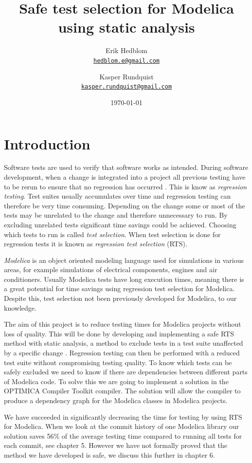 \documentclass{cslthse-msc}
\author{
	Erik Hedblom \\
	{\normalsize \href{mailto:hedblom.e@gmail.com}{\texttt{hedblom.e@gmail.com}}}
	\and
	Kasper Rundquist \\
	{\normalsize \href{mailto:kasper.rundquist@gmail.com}{\texttt{kasper.rundquist@gmail.com}}}
}
\title{Safe test selection for Modelica using static analysis}
\date{\today}
\begin{document}
\makefrontmatter
\chapter[Introduction]{Introduction}
Software tests are used to verify that software works as intended.
During software development, when a change is integrated into a project all previous testing have to be rerun to ensure that no regression has occurred \cite{DBLP:conf/sigsoft/LegunsenHSLZM16, haider2016safe}. This is know as \emph{regression testing}. Test suites usually accumulates over time and regression testing can therefore be very time consuming. Depending on the change some or most of the tests may be unrelated to the change and therefore unnecessary to run. By excluding unrelated tests significant time savings could be achieved. Choosing which tests to run is called \emph{test selection}. When test selection is done for regression tests it is known as \emph{regression test selection} (RTS).

\emph{Modelica} is an object oriented modeling language used for simulations in various areas, for example simulations of electrical components, engines and air conditioners. Usually Modelica tests have long execution times, meaning there is a great potential for time savings using regression test selection for Modelica. Despite this, test selection not been previously developed for Modelica, to our knowledge.

The aim of this project is to reduce testing times for Modelica projects without loss of quality. This will be done by developing and implementing a safe RTS method with static analysis, a method to exclude tests in a test suite unaffected by a specific change \cite{DBLP:conf/pppj/OqvistHM16}. Regression testing can then be performed with a reduced test suite without compromising testing quality. To know which tests can be safely excluded we need to know if there are dependencies between different parts of Modelica code. To solve this we are going to implement a solution in the OPTIMICA Compiler Toolkit compiler. The solution will allow the compiler to produce a dependency graph for the Modelica classes in Modelica projects.

We have succeeded in significantly decreasing the time for testing by using RTS for Modelica. When we look at the commit history of one Modelica library our solution saves 56\% of the average testing time compared to running all tests for each commit, see chapter 5. However we have not formally proved that the method we have developed is safe, we discuss this further in chapter 6.
\end{document}
